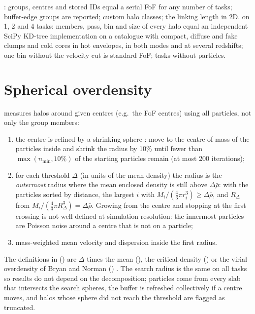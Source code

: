 \begin{validation}
: groups, centres and stored IDs equal a serial FoF for any number of tasks; buffer-edge groups are reported; custom
halo classes; the linking length in 2D.  on 1, 2 and 4 tasks: members, pass, bin and size of every halo
equal an independent SciPy KD-tree implementation on a catalogue with compact, diffuse and fake clumps and cold cores in hot envelopes, in both
modes and at several redshifts; one bin without the velocity cut is standard FoF; tasks without particles.
\end{validation}

\section{Spherical overdensity}\label{sec:halo-so}

 measures halos around given centres (e.g.\ the FoF centres) using all particles, not only the group members:
\begin{enumerate}
\item the centre is refined by a shrinking sphere \cite{Power2003}: move to the centre of mass of the particles inside and shrink the radius by
      10\% until fewer than $\max(n_{\min},10\%)$ of the starting particles remain (at most 200 iterations);
\item for each threshold $\Delta$ (in units of the mean density) the radius is the \emph{outermost} radius where the mean enclosed density is
      still above $\Delta\bar\rho$: with the particles sorted by distance, the largest $i$ with $M_i/(\frac43\pi r_i^3)\ge\Delta\bar\rho$, and
      $R_\Delta$ from $M_i/(\frac43\pi R_\Delta^3)=\Delta\bar\rho$. Growing from the centre and stopping at the first crossing is not well
      defined at simulation resolution: the innermost particles are Poisson noise around a centre that is not on a particle;
\item mass-weighted mean velocity and dispersion inside the first radius.
\end{enumerate}
The definitions in  () are $\Delta$ times the mean (), the critical density
() or the virial overdensity of Bryan and Norman () \cite{BryanNorman1998}. The search radius is the same on all tasks
so results do not depend on the decomposition; particles come from every slab that intersects the search spheres, the buffer is refreshed
collectively if a centre moves, and halos whose sphere did not reach the threshold are flagged as truncated.

